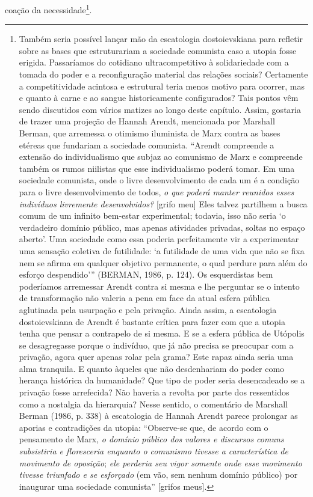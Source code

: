 coação da necessidade\footnote{Também seria possível lançar mão da
  escatologia dostoievskiana para refletir sobre as bases que
  estruturariam a sociedade comunista caso a utopia fosse erigida.
  Passaríamos do cotidiano ultracompetitivo à solidariedade com a tomada
  do poder e a reconfiguração material das relações sociais? Certamente
  a competitividade acintosa e estrutural teria menos motivo para
  ocorrer, mas e quanto à carne e ao sangue historicamente configurados?
  Tais pontos vêm sendo discutidos com vários matizes ao longo deste
  capítulo. Assim, gostaria de trazer uma projeção de Hannah Arendt,
  mencionada por Marshall Berman, que arremessa o otimismo iluminista de
  Marx contra as bases etéreas que fundariam a sociedade comunista.
  ``Arendt compreende a extensão do individualismo que subjaz ao
  comunismo de Marx e compreende também os rumos niilistas que esse
  individualismo poderá tomar. Em uma sociedade comunista, onde o livre
  desenvolvimento de cada um é a condição para o livre desenvolvimento
  de todos, \emph{o que poderá manter reunidos esses indivíduos
  livremente desenvolvidos?} {[}grifo meu{]} Eles talvez partilhem a
  busca comum de um infinito bem-estar experimental; todavia, isso não
  seria `o verdadeiro domínio público, mas apenas atividades privadas,
  soltas no espaço aberto'. Uma sociedade como essa poderia
  perfeitamente vir a experimentar uma sensação coletiva de futilidade:
  `a futilidade de uma vida que não se fixa nem se afirma em qualquer
  objetivo permanente, o qual perdure para além do esforço despendido'''
  (BERMAN, 1986, p. 124). Os esquerdistas bem poderíamos arremessar
  Arendt contra si mesma e lhe perguntar se o intento de transformação
  não valeria a pena em face da atual esfera pública aglutinada pela
  usurpação e pela privação. Ainda assim, a escatologia dostoievskiana
  de Arendt é bastante crítica para fazer com que a utopia tenha que
  pensar a contrapelo de si mesma. E se a esfera pública de Utópolis se
  desagregasse porque o indivíduo, que já não precisa se preocupar com a
  privação, agora quer apenas rolar pela grama? Este rapaz ainda seria
  uma alma tranquila. E quanto àqueles que não desdenhariam do poder
  como herança histórica da humanidade? Que tipo de poder seria
  desencadeado se a privação fosse arrefecida? Não haveria a revolta por
  parte dos ressentidos como a nostalgia da hierarquia? Nesse sentido, o
  comentário de Marshall Berman (1986, p. 338) à escatologia de Hannah
  Arendt parece prolongar as aporias e contradições da utopia:
  ``Observe-se que, de acordo com o pensamento de Marx, \emph{o domínio
  público dos valores e discursos comuns subsistiria e floresceria
  enquanto o comunismo tivesse a característica de movimento de
  oposição}; \emph{ele perderia seu vigor somente onde esse movimento
  tivesse triunfado e se esforçado} (em vão, sem nenhum domínio público)
  por inaugurar uma sociedade comunista'' {[}grifos meus{]}.}.

